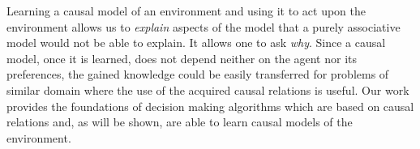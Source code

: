 \documentclass{svjour3}                     %
\begin{document}
	
Learning a causal model of an environment and using it to act upon the environment allows us to \textit{explain} aspects of the model that a purely associative model would not be able to explain. It allows one to ask \textit{why}. Since a causal model, once it is learned, does not depend neither on the agent nor its preferences, the gained knowledge could be easily transferred for problems of similar domain where the use of the acquired causal relations is useful.  Our work provides the foundations of decision making algorithms which are based on causal relations and, as will be shown, are able to learn causal models of the environment.
	

\end{document}
